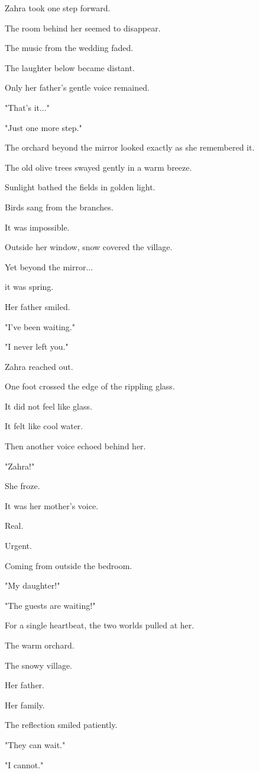 \documentclass[12pt,openany]{book}
\begin{document}
Zahra took one step forward.

The room behind her seemed to disappear.

The music from the wedding faded.

The laughter below became distant.

Only her father's gentle voice remained.

"That's it..."

"Just one more step."

The orchard beyond the mirror looked exactly as she remembered it.

The old olive trees swayed gently in a warm breeze.

Sunlight bathed the fields in golden light.

Birds sang from the branches.

It was impossible.

Outside her window, snow covered the village.

Yet beyond the mirror...

it was spring.

Her father smiled.

"I've been waiting."

"I never left you."

Zahra reached out.

One foot crossed the edge of the rippling glass.

It did not feel like glass.

It felt like cool water.

Then another voice echoed behind her.

"Zahra!"

She froze.

It was her mother's voice.

Real.

Urgent.

Coming from outside the bedroom.

"My daughter!"

"The guests are waiting!"

For a single heartbeat, the two worlds pulled at her.

The warm orchard.

The snowy village.

Her father.

Her family.

The reflection smiled patiently.

"They can wait."

"I cannot."
\end{document}
